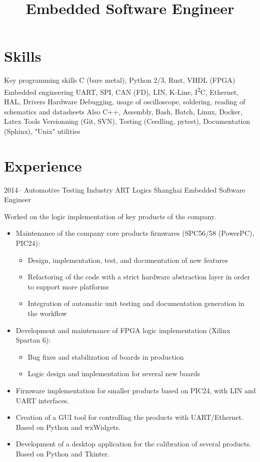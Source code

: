 \documentclass[11pt,a4paper,sans]{moderncv}        %
\title{Embedded Software Engineer}
\begin{document}
\makecvtitle

\section{Skills}
\cvitem
  {Key programming skills}
  {C (bare metal), Python 2/3, Rust, VHDL (FPGA)}
\cvitem
  {Embedded engineering}
  {UART, SPI, CAN (FD), LIN, K-Line, I\textsuperscript{2}C, Ethernet, HAL, Drivers}
\cvitem
  {Hardware}
  {Debugging, usage of oscilloscope, soldering, reading of schematics and datasheets}
\cvitem
  {Also}
  {C++, Assembly, Bash, Batch, Linux, Docker, Latex}
\cvitem
  {Tools}
  {Versionning (Git, SVN), Testing (Ceedling, pytest), Documentation (Sphinx), "Unix" utilities}

\section{Experience}
\cventry
  {2014--\the\year}
  {Automotive Testing Industry}
  {ART Logics}
  {Shanghai}
  {Embedded Software Engineer}
  {
    Worked on the logic implementation of key products of the company.
    \begin{itemize}%
    \item Maintenance of the company core products firmwares (SPC56/58 (PowerPC), PIC24):
      \begin{itemize}%
      \item Design, implementation, test, and documentation of new features
      \item Refactoring of the code with a strict hardware abstraction layer in order to support more platforms
      \item Integration of automatic unit testing and documentation generation in the workflow
      \end{itemize}
    \item Development and maintenance of FPGA logic implementation (Xilinx Spartan 6):
      \begin{itemize}%
      \item Bug fixes and stabilization of boards in production
      \item Logic design and implementation for several new boards
      \end{itemize}
    \item Firmware implementation for smaller products based on PIC24, with LIN and UART interfaces.
    \item Creation of a GUI tool for controlling the products with UART/Ethernet. Based on Python and wxWidgets.
    \item Development of a desktop application for the calibration of several products. Based on Python and Tkinter.
    \end{itemize}
  }
\end{document}
